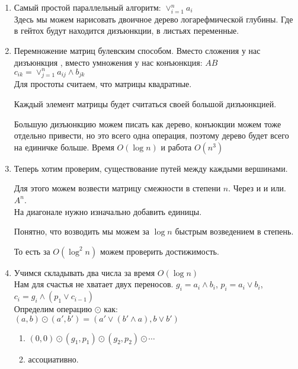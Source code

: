 \begin{exmp}
\begin{enumerate}
\item Самый простой параллельный алгоритм:
$\vee_{i = 1}^{n}a_i$\\

Здесь мы можем нарисовать двоичное дерево логарефмической глубины.
Где в гейтох будут находится дизъюнкции, в листьях переменные.

\item
Перемножение матриц булевским способом. Вместо сложения у нас дизъюнкция
, вместо умножения у нас конъюнкция:
$AB$ \\
$c_{ik} = \vee_{j = 1}^{n}a_{ij}\wedge b_{jk}$\\

Для простоты считаем, что матрицы квадратные. 

Каждый элемент матрицы будет считаться своей большой дизъюнкцией. 

Большую дизъюнкцию можем писать как дерево, конъюкции
можем тоже отдельно привести, но это
всего одна операция, поэтому дерево будет 
всего на единичке больше. Время $O(\log n)$  и работа $O(n^3)$\\

\item 
Теперь хотим проверим, существование путей между каждыми вершинами.

Для этого можем возвести матрицу смежности в степени $n$. Через и и или. 
$A^n$.\\
На диагонале нужно изначально добавить единицы. 

Понятно, что возводить мы можем за $\log n$ быстрым возведением в степень. 

То есть за $O(\log^2n)$  можем проверить достижимость. 

\item 
Учимся складывать два числа за время $O(\log n)$\\

Нам для счастья не хватает двух переносов. $g_i = a_i \wedge b_i$, $p_i = a_i \vee b_i$, $c_i = g_i \wedge (p_1 \vee c_{i - 1})$\\

Определим операцию $\odot$ как:\\
$(a, b) \odot (a', b') = (a' \vee (b' \wedge a), b \vee b')$\\

\begin{enumerate}
\item $(0, 0) \odot (g_1, p_1) \odot (g_2, p_2) \odot \cdots$
\item ассоциативно. 
\end{enumerate}


\end{enumerate}
\end{exmp}
